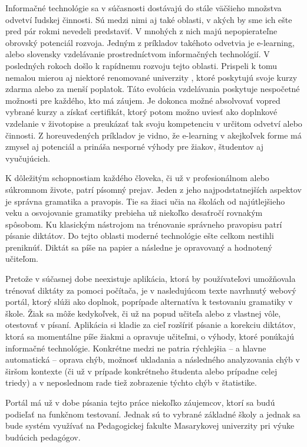 \documentclass[12pt,oneside]{fithesis2}
\begin{document}
  \par Informačné technológie sa v súčasnosti dostávajú do stále väčšieho množstva odvetví ľudskej činnosti. Sú medzi nimi aj také oblasti, v akých by sme ich ešte pred pár rokmi nevedeli predstaviť. V mnohých z nich majú nepopierateľne obrovský potenciál rozvoja. Jedným z príkladov takéhoto odvetvia je e-learning, alebo slovensky vzdelávanie prostredníctvom
informačných technológií. V posledných rokoch došlo k rapídnemu rozvoju tejto oblasti. Prispeli k tomu
      nemalou mierou aj niektoré renomované univerzity \cite{crimson15}, ktoré poskytujú svoje kurzy zdarma alebo za menší poplatok. Táto evolúcia vzdelávania poskytuje nespočetné možnosti pre každého, kto má záujem. Je dokonca možné absolvovať vopred vybrané kurzy a získať certifikát, ktorý potom možno uviesť ako doplnkové vzdelanie v životopise a preukázať tak svoju kompetenciu v určitom odvetví alebo činnosti. Z horeuvedených príkladov je vidno, že e-learning v akejkoľvek forme má zmysel aj potenciál a prináša nesporné výhody pre žiakov, študentov aj vyučujúcich. 
  \par K dôležitým schopnostiam každého človeka, či už v profesionálnom alebo súkromnom živote, patrí písomný prejav. Jeden z jeho najpodstatnejších aspektov je správna gramatika a pravopis. Tie sa žiaci učia na školách od najútlejšieho veku a osvojovanie gramatiky prebieha už niekoľko desaťročí rovnakým spôsobom. Ku klasickým nástrojom na trénovanie správneho pravopisu patrí písanie diktátov. Do tejto oblasti moderné technológie ešte celkom nestihli preniknúť. Diktát sa píše na papier a následne je opravovaný a hodnotený učiteľom.
  \par Pretože v súčasnej dobe neexistuje aplikácia, ktorá by používateľovi umožňovala trénovať diktáty za pomoci počítača, je v nasledujúcom texte navrhnutý webový portál, ktorý slúži ako doplnok, poprípade alternatíva k testovaniu gramatiky v škole. Žiak sa môže kedykoľvek, či už na popud učiteľa alebo z vlastnej vôle, otestovať v písaní. Aplikácia si kladie za cieľ rozšíriť písanie a korekciu diktátov, ktorá sa momentálne píše žiakmi a opravuje učiteľmi, o výhody, ktoré ponúkajú informačné technológie. Konkrétne medzi ne patria rýchlejšia -- a hlavne automatická -- oprava chýb, možnosť ukladania a následného analyzovania chýb v širšom kontexte (či už v prípade konkrétneho študenta alebo prípadne celej triedy) a v neposlednom rade tiež zobrazenie týchto chýb v štatistike.
  \par Portál má už v dobe písania tejto práce niekoľko záujemcov, ktorí sa budú podieľať na funkčnom testovaní. Jednak sú to vybrané základné školy a jednak sa bude systém využívať na Pedagogickej fakulte Masarykovej univerzity pri výuke budúcich pedagógov.
    
\end{document}
